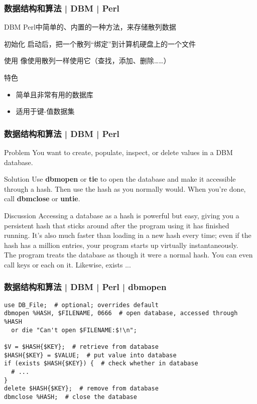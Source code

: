 \begin{frame}
  \frametitle{数据结构和算法 | DBM | Perl}
  \begin{block}{DBM}
    Perl中简单的、内置的一种方法，来存储散列数据
  \end{block}
  \pause
  \begin{block}{初始化}
    启动后，把一个散列“绑定”到计算机硬盘上的一个文件
  \end{block}
  \pause
  \begin{block}{使用}
    像使用散列一样使用它（查找，添加、删除……）
  \end{block}
  \pause
  \begin{block}{特色}
    \begin{itemize}
      \item 简单且非常有用的数据库
      \item 适用于键-值数据集
    \end{itemize}
  \end{block}
\end{frame}

\begin{frame}
  \frametitle{数据结构和算法 | DBM | Perl}
  \begin{block}{Problem}
    You want to create, populate, inspect, or delete values in a DBM database.
  \end{block}
  \pause
  \begin{block}{Solution}
    Use \textbf{dbmopen} or \textbf{tie} to open the database and make it accessible through a hash. Then use the hash as you normally would. When you’re done, call \textbf{dbmclose} or \textbf{untie}.
  \end{block}
  \pause
  \begin{block}{Discussion}
    {\small Accessing a database as a hash is powerful but easy, giving you a persistent hash that sticks around after the program using it has finished running. It's also much faster than loading in a new hash every time; even if the hash has a million entries, your program starts up virtually instantaneously.}\\
    \vspace{0.1em}
    {\small The program treats the database as though it were a normal hash. You can even call keys or each on it. Likewise, exists ...}
  \end{block}
\end{frame}

\begin{frame}[fragile]
  \frametitle{数据结构和算法 | DBM | Perl | dbmopen}
\begin{lstlisting}
use DB_File;  # optional; overrides default
dbmopen %HASH, $FILENAME, 0666  # open database, accessed through %HASH
  or die "Can't open $FILENAME:$!\n";

$V = $HASH{$KEY};  # retrieve from database
$HASH{$KEY} = $VALUE;  # put value into database
if (exists $HASH{$KEY}) {  # check whether in database
  # ...
}
delete $HASH{$KEY};  # remove from database
dbmclose %HASH;  # close the database
\end{lstlisting}
\end{frame}

